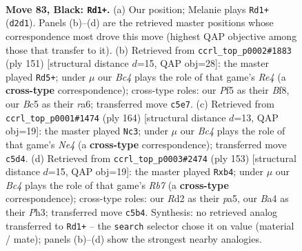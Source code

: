 \documentclass[11pt]{article}
\begin{document}
\clearpage

\begin{figure}[p]\centering
\begin{subfigure}{0.46\textwidth}\centering
\resizebox{\linewidth}{!}{%
\newchessgame
\chessboard[
  setfen={8/P5k1/4R3/2b2p2/b4P2/8/3r4/7K b - - 2 83},
  showmover=false,
  pgfstyle=straightmove, color=movearrow, markmove={d2-d1}
]}
\caption{}
\end{subfigure}\hfill
\begin{subfigure}{0.46\textwidth}\centering
\resizebox{\linewidth}{!}{%
\newchessgame
\chessboard[
  setfen={5b2/7k/R7/4r3/p6B/P2KP3/8/8 b - - 6 76},
  showmover=false,
  pgfstyle=straightmove, color=movearrow, markmove={e5-d5}
]}
\caption{}
\end{subfigure}
\\[4pt]
\begin{subfigure}{0.46\textwidth}\centering
\resizebox{\linewidth}{!}{%
\newchessgame
\chessboard[
  setfen={8/3k4/8/1P6/3BN3/6p1/r7/2K5 w - - 2 83},
  showmover=false,
  pgfstyle=straightmove, color=movearrow, markmove={e4-c3}
]}
\caption{}
\end{subfigure}\hfill
\begin{subfigure}{0.46\textwidth}\centering
\resizebox{\linewidth}{!}{%
\newchessgame
\chessboard[
  setfen={8/7k/8/P5p1/1P6/3K1P1p/1r6/2R5 b - - 3 77},
  showmover=false,
  pgfstyle=straightmove, color=movearrow, markmove={b2-b4}
]}
\caption{}
\end{subfigure}
\caption{\textbf{Move 83, Black: \texttt{Rd1+}.} (a) Our position; Melanie plays \texttt{Rd1+} (\texttt{d2d1}). Panels (b)--(d) are the retrieved master positions whose correspondence most drove this move (highest QAP objective among those that transfer to it). (b) Retrieved from \texttt{ccrl\_top\_p0002\#1883} (ply 151) [structural distance $d$=15, QAP obj=28]: the master played \texttt{Rd5+}; under $\mu$ our \emph{Bc4} plays the role of that game's \emph{Re4} (a \textbf{cross-type} correspondence); cross-type roles: our \emph{P}f5 as their \emph{B}f8, our \emph{B}c5 as their \emph{r}a6; transferred move \texttt{c5e7}. (c) Retrieved from \texttt{ccrl\_top\_p0001\#1474} (ply 164) [structural distance $d$=13, QAP obj=19]: the master played \texttt{Nc3}; under $\mu$ our \emph{Bc4} plays the role of that game's \emph{Ne4} (a \textbf{cross-type} correspondence); transferred move \texttt{c5d4}. (d) Retrieved from \texttt{ccrl\_top\_p0003\#2474} (ply 153) [structural distance $d$=15, QAP obj=19]: the master played \texttt{Rxb4}; under $\mu$ our \emph{Bc4} plays the role of that game's \emph{Rb7} (a \textbf{cross-type} correspondence); cross-type roles: our \emph{R}d2 as their \emph{p}a5, our \emph{B}a4 as their \emph{P}h3; transferred move \texttt{c5b4}. Synthesis: no retrieved analog transferred to \texttt{Rd1+} -- the \texttt{search} selector chose it on value (material / mate); panels (b)--(d) show the strongest nearby analogies.}
\label{fig:thought-m165}
\end{figure}
\end{document}
